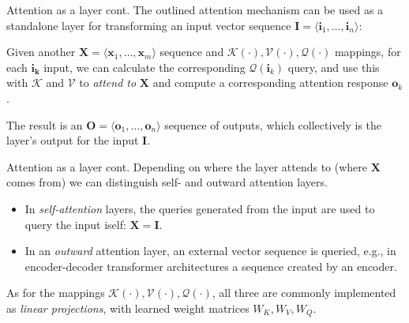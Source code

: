 \documentclass[style=upen, size=14pt]{powerdot}
\newcommand{\gold}{\color{arany}}
\theoremstyle{definition}
\begin{document}
\begin{slide}[toc=Attention layer]{Attention as a layer cont.}
  The outlined attention mechanism can be used as a standalone layer for
  transforming an input vector sequence
  $\mathbf{I} = \langle \mathbf{i}_1,\dots, \mathbf{i}_n \rangle$:\bigskip

  Given another $\mathbf{X} = \langle \mathbf{x}_1,\dots, \mathbf{x}_m \rangle$
  sequence and $\mathcal K(\cdot),\mathcal V(\cdot),\mathcal Q(\cdot)$ mappings,
  for each $\mathbf{i_k}$ input, we can calculate the corresponding
  $\mathcal Q(\mathbf{i}_k)$ query, and use this with $\mathcal K$ and
  $\mathcal V$ to \emph{attend to} $\mathbf{X}$ and compute a corresponding
  attention response $\mathbf{o}_k$.\bigskip

  The result is an $\mathbf{O}=\langle \mathbf{o}_1,\dots,\mathbf{o}_n \rangle$
  sequence of outputs, which collectively is the layer's output for the input
  $\mathbf{I}$.
\end{slide}

\begin{slide}[toc=]{Attention as a layer cont.}
  Depending on where the layer attends to (where $\mathbf{X}$ comes from) we can
  distinguish self- and outward attention layers.
  \begin{itemize}
  \item In \emph{\gold self-attention} layers, the queries generated from the
    input are used to query the input iself: $\mathbf{X}=\mathbf{I}$.
  \item In an \emph{\gold outward} attention layer, an external vector sequence
    is queried, e.g., in encoder-decoder transformer architectures a sequence
    created by an encoder.
  \end{itemize}
  As for the mappings $\mathcal K(\cdot),\mathcal V(\cdot),\mathcal Q(\cdot)$,
  all three are commonly implemented as \emph{\gold linear projections}, with
  learned weight matrices $W_K, W_V, W_Q$.
\end{slide}
\end{document}
